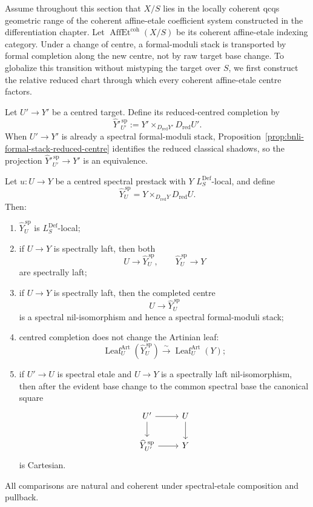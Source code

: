 Assume throughout this section that $X/S$ lies in the locally coherent qcqs
geometric range of the coherent affine-etale coefficient system constructed in
the differentiation chapter.  Let
$\operatorname{AffEt}^{\mathrm{coh}}(X/S)$ be its coherent affine-etale
indexing category.  Under a change of centre, a formal-moduli stack is
transported by formal completion along the new centre, not by raw target base
change.  To globalize this transition without mistyping the target over $S$,
we first construct the relative reduced chart through which every coherent
affine-etale centre factors.

\begin{definition}
\label{def:bnli-reduced-centred-completion}
Let $U'\to Y'$ be a centred target.  Define its reduced-centred completion by
\[
\boxed{
    \widehat Y'^{\,\mathrm{sp}}_{U'}
    :=
    Y'\times_{D_{\mathrm{red}}Y'}D_{\mathrm{red}}U'.}
\]
When $U'\to Y'$ is already a spectral formal-moduli stack,
Proposition~\ref{prop:bnli-formal-stack-reduced-centre} identifies the reduced
classical shadows, so the projection
$\widehat Y'^{\,\mathrm{sp}}_{U'}\to Y'$ is an equivalence.
\end{definition}

\begin{proposition}
\label{prop:bnli-completion-stability}
Let $u:U\to Y$ be a centred spectral prestack with $Y$
$L_S^{\mathrm{Def}}$-local, and define
\[
    \widehat Y^{\,\mathrm{sp}}_U
    =
    Y\times_{D_{\mathrm{red}}Y}D_{\mathrm{red}}U.
\]
Then:
\begin{enumerate}
    \item $\widehat Y^{\,\mathrm{sp}}_U$ is
    $L_S^{\mathrm{Def}}$-local;
    \item if $U\to Y$ is spectrally laft, then both
    \[
        U\longrightarrow\widehat Y^{\,\mathrm{sp}}_U,
        \qquad
        \widehat Y^{\,\mathrm{sp}}_U\longrightarrow Y
    \]
    are spectrally laft;
    \item if $U\to Y$ is spectrally laft, then the completed centre
    \[
        U\longrightarrow\widehat Y^{\,\mathrm{sp}}_U
    \]
    is a spectral nil-isomorphism and hence a spectral formal-moduli stack;
    \item centred completion does not change the Artinian leaf:
    \[
        \operatorname{Leaf}^{\mathrm{Art}}_U
        \left(
          \widehat Y^{\,\mathrm{sp}}_U
        \right)
        \xrightarrow{\sim}
        \operatorname{Leaf}^{\mathrm{Art}}_U(Y);
    \]
    \item if $U'\to U$ is spectral etale and $U\to Y$ is a spectrally
    laft nil-isomorphism, then after the evident base change to the common
    spectral base the canonical square
    \[
    \begin{tikzcd}
    U' \arrow[r] \arrow[d] &
    U \arrow[d]\\
    \widehat Y^{\,\mathrm{sp}}_{U'} \arrow[r] &
    Y
    \end{tikzcd}
    \]
    is Cartesian.
\end{enumerate}
All comparisons are natural and coherent under spectral-etale composition and
pullback.
\end{proposition}

